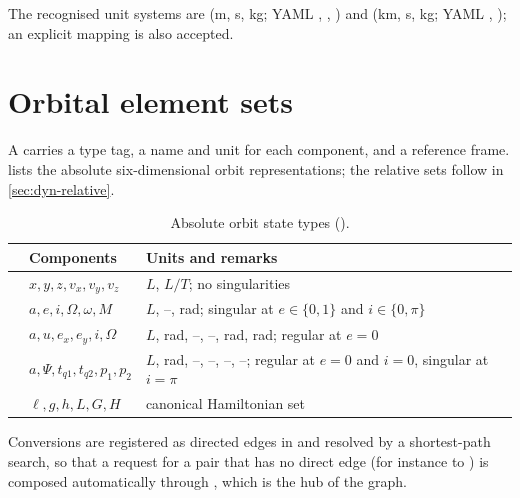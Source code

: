 The recognised unit systems are  (\si{\meter}, \si{\second},
\si{\kilogram}; YAML , , ) and
 (\si{\kilo\meter}, \si{\second}, \si{\kilogram}; YAML
, ); an explicit mapping
 is also accepted.

\section{Orbital element sets}
\label{sec:dyn-elements}

A \lupnt{}  carries a type tag, a name and unit for each component,
and a reference frame.  lists the absolute
six-dimensional orbit representations; the relative sets follow in
\cref{sec:dyn-relative}.

\begin{table}[H]
  \centering
  \caption{Absolute orbit state types ().}
  \label{tab:dyn-elements}
  \begin{tabularx}{\textwidth}{llL}
    \toprule
     & Components & Units and remarks \\
    \midrule
     & $x,y,z,v_x,v_y,v_z$ & $L$, $L/T$; no singularities \\
     & $a,e,i,\Omega,\omega,M$ & $L$, --, rad; singular at $e\in\{0,1\}$ and $i\in\{0,\pi\}$ \\
     & $a,u,e_x,e_y,i,\Omega$ & $L$, rad, --, --, rad, rad; regular at $e=0$ \\
     & $a,\Psi,t_{q1},t_{q2},p_1,p_2$ & $L$, rad, --, --, --, --; regular at $e=0$ and $i=0$, singular at $i=\pi$ \\
     & $\ell,g,h,L,G,H$ & canonical Hamiltonian set \\
    \bottomrule
  \end{tabularx}
\end{table}

Conversions are registered as directed edges in
 and resolved by a
shortest-path search, so that a request for a pair that has no direct edge (for
instance  to ) is composed automatically through
, which is the hub of the graph.

